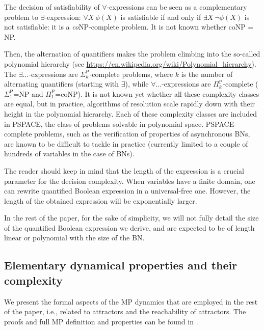 \documentclass[PCJ,Unicode,screen,mode=plain]{cedram}
\begin{document}
The decision of satisfiability of \(\forall\)-expressions can be seen as
a complementary problem to \(\exists\)-expression: \(\forall X~\phi(X)\)
is satisfiable if and only if \(\exists X~\neg\phi(X)\) is not
satisfiable: it is a \emph{co}NP-complete problem. It is not known
whether coNP = NP.

Then, the alternation of quantifiers makes the problem climbing into the
so-called polynomial hierarchy (see
  \href{https://en.wikipedia.org/wiki/Polynomial_hierarchy}{https://en.wikipedia.org/wiki/Polynomial\_hierarchy}).
  The
\(\exists\ldots\)-expressions are \(\Sigma_k^{\mathrm P}\)-complete
problems, where \(k\) is the number of alternating quantifiers (starting
with \(\exists\)), while \(\forall\ldots\)-expressions are
\(\Pi_k^{\mathrm P}\)-complete (\(\Sigma_1^{\mathrm P}\)=NP and
\(\Pi_1^{\mathrm P}\)=coNP). It is not known yet whether all these
complexity classes are equal, but in practice, algorithms of resolution
scale rapidly down with their height in the polynomial hierarchy. Each
of these complexity classes are included in PSPACE, the class of
problems solvable in polynomial space. PSPACE-complete problems, such as
the verification of properties of asynchronous BNs, are known to be
difficult to tackle in practice (currently limited to a couple of
hundreds of variables in the case of BNs).

The reader should keep in mind that the length of the expression is a
crucial parameter for the decision complexity. When variables have a
finite domain, one can rewrite quantified Boolean expression in a
universal-free one. However, the length of the obtained expression will
be exponentially larger.

In the rest of the paper, for the sake of simplicity, we will not fully
detail the size of the quantified Boolean expression we derive, and are
expected to be of length linear or polynomial with the size of the BN.
\hypertarget{elementary-dynamical-properties-and-their-complexity}{%
\subsection{Elementary dynamical properties and their
complexity}\label{elementary-dynamical-properties-and-their-complexity}}

We present the formal aspects of the MP dynamics that are employed in
the rest of the paper, i.e., related to attractors and the reachability
of attractors. The proofs and full MP definition and properties can be
found in \citep{Pauleve2020}.
\end{document}
